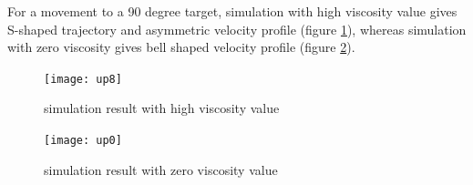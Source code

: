 For a movement to a 90 degree target, simulation with high viscosity value gives S-shaped trajectory and asymmetric velocity profile  (figure \ref{fig:0.8}), whereas simulation with zero viscosity gives bell shaped velocity profile (figure \ref{fig 0.0}).
\begin{figure}[h]
	\centering
	\texttt{[image: up8]} 
	\caption{simulation result with high viscosity value}
	\label{fig:0.8}
\end{figure}
\begin{figure}[h]
	\centering
	\texttt{[image: up0]}
	\caption{simulation result with zero viscosity value}
	\label{fig 0.0}
\end{figure}




